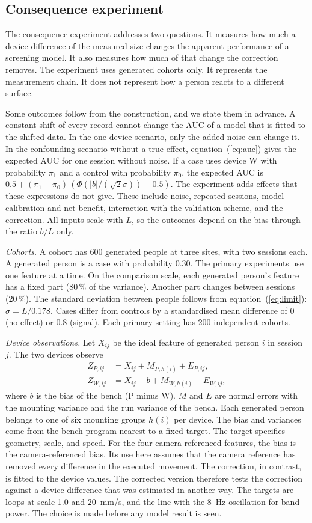 \subsection{Consequence experiment}
\label{sec:consequence}
The consequence experiment addresses two questions.
It measures how much a device difference of the measured size changes the apparent performance of a screening model.
It also measures how much of that change the correction removes.
The experiment uses generated cohorts only.
It represents the measurement chain.
It does not represent how a person reacts to a different surface.

Some outcomes follow from the construction, and we state them in advance.
A constant shift of every record cannot change the AUC of a model that is fitted to the shifted data.
In the one-device scenario, only the added noise can change it.
In the confounding scenario without a true effect, equation~(\ref{eq:auc}) gives the expected AUC for one session without noise.
If a case uses device W with probability $\pi_1$ and a control with probability $\pi_0$, the expected AUC is $0.5+(\pi_1-\pi_0)\,(\Phi(|b|/(\sqrt{2}\sigma))-0.5)$.
The experiment adds effects that these expressions do not give.
These include noise, repeated sessions, model calibration and net benefit, interaction with the validation scheme, and the correction.
All inputs scale with $L$, so the outcomes depend on the bias through the ratio $b/L$ only.

\emph{Cohorts.}
A cohort has 600 generated people at three sites, with two sessions each.
A generated person is a case with probability 0.30.
The primary experiments use one feature at a time.
On the comparison scale, each generated person's feature has a fixed part (80\,\% of the variance).
Another part changes between sessions (20\,\%).
The standard deviation between people follows from equation~(\ref{eq:limit}): $\sigma=L/0.178$.
Cases differ from controls by a standardised mean difference of 0 (no effect) or 0.8 (signal).
Each primary setting has 200 independent cohorts.

\emph{Device observations.}
Let $X_{ij}$ be the ideal feature of generated person $i$ in session $j$.
The two devices observe
\begin{align}
Z_{P,ij}&=X_{ij}+M_{P,h(i)}+E_{P,ij},\\
Z_{W,ij}&=X_{ij}-b+M_{W,h(i)}+E_{W,ij},
\end{align}
where $b$ is the bias of the bench (P minus W).
$M$ and $E$ are normal errors with the mounting variance and the run variance of the bench.
Each generated person belongs to one of six mounting groups $h(i)$ per device.
The bias and variances come from the bench program nearest to a fixed target.
The target specifies geometry, scale, and speed.
For the four camera-referenced features, the bias is the camera-referenced bias.
Its use here assumes that the camera reference has removed every difference in the executed movement.
The correction, in contrast, is fitted to the device values.
The corrected version therefore tests the correction against a device difference that was estimated in another way.
The targets are loops at scale 1.0 and 20~mm/s, and the line with the 8~Hz oscillation for band power.
The choice is made before any model result is seen.

